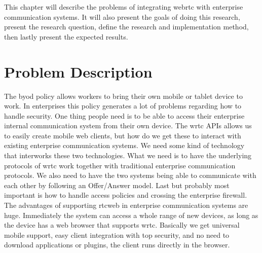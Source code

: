 
This chapter will describe the problems of integrating \gls{webrtc} with enterprise communication systems. It will also present the goals of doing this research, present the research question, define the research and implementation method, then lastly present the expected results.

\section{Problem Description}
The \gls{byod} policy allows workers to bring their own mobile or tablet device to work. In enterprises this policy generates a lot of problems regarding how to handle security. One thing people need is to be able to access their enterprise internal communication system from their own device. The \gls{wrtc} APIs allows us to easily create mobile web clients, but how do we get these to interact with existing enterprise communication systems. We need some kind of technology that interworks these two technologies. What we need is to have the underlying protocols of \gls{wrtc} work together with traditional enterprise communication protocols. We also need to have the two systems being able to communicate with each other by following an Offer/Answer model. Last but probably most important is how to handle access policies and crossing the enterprise firewall. The advantages of supporting \gls{rtcweb} in enterprise communication systems are huge. Immediately the system can access a whole range of new devices, as long as the device has a web browser that supports \gls{wrtc}. Basically we get universal mobile support, easy client integration with top security, and no need to download applications or plugins, the client runs directly in the browser.





